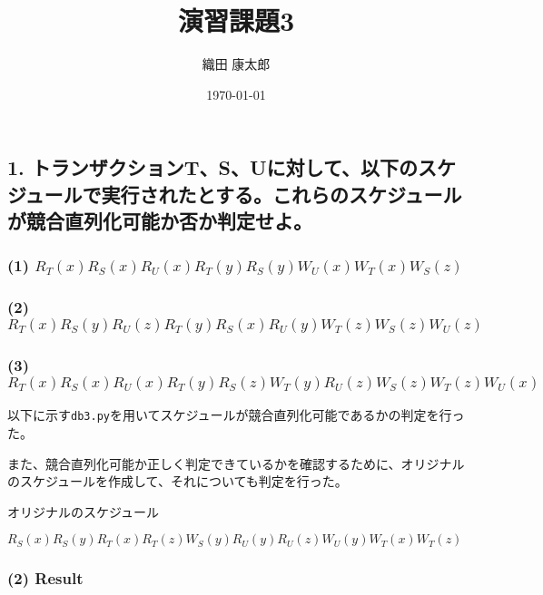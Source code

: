 \documentclass[a4paper]{jarticle}
\title{演習課題3}
\author{織田 康太郎}
\date{\today}
\begin{document}
\maketitle

\subsection*{1. トランザクションT、S、Uに対して、以下のスケジュールで実行されたとする。これらのスケジュールが競合直列化可能か否か判定せよ。}

\subsubsection*{(1) $R_{T}(x)R_{S}(x)R_{U}(x)R_{T}(y)R_{S}(y)W_{U}(x)W_{T}(x)W_{S}(z)$}
\subsubsection*{(2) $R_{T}(x)R_{S}(y)R_{U}(z)R_{T}(y)R_{S}(x)R_{U}(y)W_{T}(z)W_{S}(z)W_{U}(z)$}
\subsubsection*{(3) $R_{T}(x)R_{S}(x)R_{U}(x)R_{T}(y)R_{S}(z)W_{T}(y)R_{U}(z)W_{S}(z)W_{T}(z)W_{U}(x)$}

\par 以下に示す\verb|db3.py|を用いてスケジュールが競合直列化可能であるかの判定を行った。
\par また、競合直列化可能か正しく判定できているかを確認するために、オリジナルのスケジュールを作成して、それについても判定を行った。

\par オリジナルのスケジュール
\par $R_{S}(x)R_{S}(y)R_{T}(x)R_{T}(z)W_{S}(y)R_{U}(y)R_{U}(z)W_{U}(y)W_{T}(x)W_{T}(z)$



\vspace{-3mm}
\subsubsection*{(2) Result}

\end{document}
